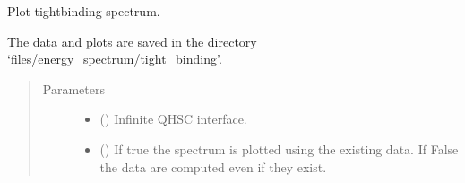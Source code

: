 \documentclass[letterpaper,10pt,english]{sphinxmanual}
\begin{document}
\begin{fulllineitems}
\label{\detokenize{modules:modules.utils.plot_spectrum_TB}}
\pysigstartsignatures
{}
\pysigstopsignatures
\sphinxAtStartPar
Plot tight\sphinxhyphen{}binding spectrum.

\sphinxAtStartPar
The data and plots are saved in the directory ‘files/energy\_spectrum/tight\_binding’.
\begin{quote}\begin{description}
\item[{Parameters}] \leavevmode\begin{itemize}
\item {} 
\sphinxAtStartPar
{} () \textendash{} Infinite QH\sphinxhyphen{}SC interface.

\item {} 
\sphinxAtStartPar
{} () \textendash{} If true the spectrum is plotted using the existing data.
If False the data are computed even if they exist.

\end{itemize}

\end{description}\end{quote}

\end{fulllineitems}

\end{document}
